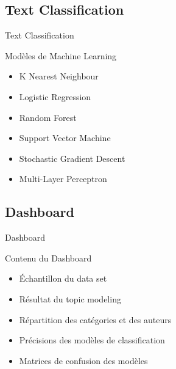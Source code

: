 \documentclass[10pt,sans,usenames,dvipsnames,english,compress]{beamer}
\begin{document}
\subsection{Text Classification}
\begin{frame}{Text Classification}
	\begin{exampleblock}{Modèles de Machine Learning}
            \begin{itemize}
            \item K Nearest Neighbour
            \item Logistic Regression
            \item Random Forest
            \item Support Vector Machine
            \item Stochastic Gradient Descent
            \item Multi-Layer Perceptron
            \end{itemize}
	\end{exampleblock}

\end{frame}

\subsection{Dashboard}
\begin{frame}{Dashboard}
	\begin{exampleblock}{Contenu du Dashboard}
            \begin{itemize}
            \item Échantillon du data set
            \item Résultat du topic modeling
            \item Répartition des catégories et des auteurs
            \item Précisions des modèles de classification
            \item Matrices de confusion des modèles
            \end{itemize}
	\end{exampleblock}
\end{frame}
\end{document}
